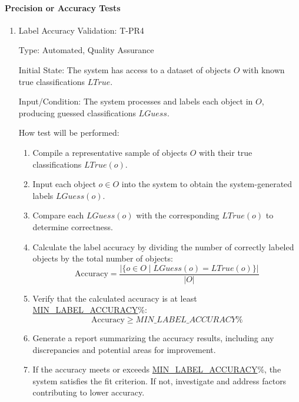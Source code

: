 \documentclass[12pt, titlepage]{article}
\begin{document}
\paragraph{Precision or Accuracy Tests}
\begin{enumerate}

\item{Label Accuracy Validation: T-PR4\\}

Type: Automated, Quality Assurance

Initial State: The system has access to a dataset of objects \( O \) with known true classifications \( LTrue \).

Input/Condition: The system processes and labels each object in \( O \), producing guessed classifications \( LGuess \).

How test will be performed:
\begin{enumerate}
    \item Compile a representative sample of objects \( O \) with their true classifications \( LTrue(o) \).
    \item Input each object \( o \in O \) into the system to obtain the system-generated labels \( LGuess(o) \).
    \item Compare each \( LGuess(o) \) with the corresponding \( LTrue(o) \) to determine correctness.
    \item Calculate the label accuracy by dividing the number of correctly labeled objects by the total number of objects:
    \[
    \text{Accuracy} = \frac{|\{ o \in O \mid LGuess(o) = LTrue(o) \}|}{|O|}
    \]
    \item Verify that the calculated accuracy is at least \hyperref[MIN_LABEL_ACCURACY]{MIN\_LABEL\_ACCURACY}\%:
    \[
    \text{Accuracy} \geq \hyperref[MIN_LABEL_ACCURACY]{MIN\_LABEL\_ACCURACY}\%
    \]
    \item Generate a report summarizing the accuracy results, including any discrepancies and potential areas for improvement.
    \item If the accuracy meets or exceeds \hyperref[MIN_LABEL_ACCURACY]{MIN\_LABEL\_ACCURACY}\%, the system satisfies the fit criterion. If not, investigate and address factors contributing to lower accuracy.
\end{enumerate}


\end{enumerate}

\end{document}
